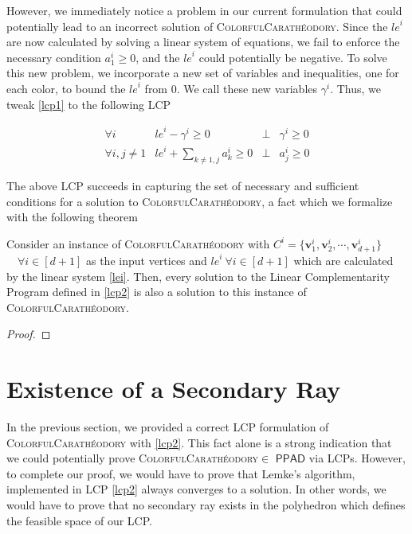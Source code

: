 \documentclass[a4paper,11pt]{article}
\def\cc#1{\mathsf{#1}}
\def\PPAD{\ensuremath{\cc{PPAD}}\xspace}
\def\problem#1{\textsc{#1}}
\def\v{\textbf{v}}
\def\CCP{\problem{ColorfulCarath\'eodory}\xspace}
\begin{document}
\par However, we immediately notice a problem in our current formulation that could potentially lead to an
incorrect solution of \CCP. Since the ${le}^i$ are now calculated by solving a linear system of equations,
we fail to enforce the necessary condition $a^i_1 \geq 0$, and the ${le}^i$ could potentially be negative.
To solve this new problem, we incorporate a new set of variables and inequalities, one for each color, to
bound the ${le}^i$ from $0$. We call these new variables $\gamma^i$. Thus, we tweak \eqref{lcp1} to the
following LCP

\begin{equation}\label{lcp2}
\begin{array}{lccl}
\forall i & {le}^i - \gamma^i \geq 0 & \bot & \gamma^i \geq 0 \\
\forall i, j \neq 1 & {le}^i + \sum_{k \neq 1, j} {a^i_k} \geq 0 & \bot & a^i_j \geq 0
\end{array}
\end{equation}

\par The above LCP succeeds in capturing the set of necessary and sufficient conditions for a solution to \CCP,
a fact which we formalize with the following theorem

\begin{theorem}
Consider an instance of \CCP with $C^i = ${\normalfont$\{ \v^i_1, \v^i_2, \cdots, \v^i_{d+1} \}$}
$\quad \forall i \in [d+1]$ as the input vertices and ${le}^i \: \forall i \in [d+1]$ which are calculated by
the linear system \eqref{lei}. Then, every solution to the Linear Complementarity Program defined in \eqref{lcp2}
is also a solution to this instance of \CCP.
\end{theorem}

\begin{proof}
\end{proof}


\section{Existence of a Secondary Ray}

\par In the previous section, we provided a correct LCP formulation of \CCP with \eqref{lcp2}. This fact alone
is a strong indication that we could potentially prove \CCP $\in$ \PPAD via LCPs. However, to complete our
proof, we would have to prove that Lemke's algorithm, implemented in LCP \eqref{lcp2} always converges to a solution.
In other words, we would have to prove that no secondary ray exists in the polyhedron which defines the feasible
space of our LCP.
\end{document}
